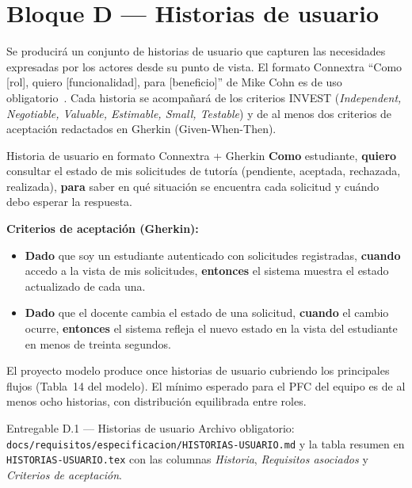 \documentclass[11pt,a4paper]{article}
\begin{document}
\section{Bloque D --- Historias de usuario}

Se producir\'a un conjunto de historias de usuario que capturen las necesidades expresadas por los actores desde su punto de vista. El formato Connextra ``Como [rol], quiero [funcionalidad], para [beneficio]'' de Mike Cohn es de uso obligatorio~\cite{cohn2004userstories}. Cada historia se acompa\~nar\'a de los criterios INVEST (\emph{Independent, Negotiable, Valuable, Estimable, Small, Testable}) y de al menos dos criterios de aceptaci\'on redactados en Gherkin (Given-When-Then).

\begin{cajaconcepto}{Historia de usuario en formato Connextra + Gherkin}
\textbf{Como} estudiante, \textbf{quiero} consultar el estado de mis solicitudes de tutor\'ia (pendiente, aceptada, rechazada, realizada), \textbf{para} saber en qu\'e situaci\'on se encuentra cada solicitud y cu\'ando debo esperar la respuesta.

\textbf{Criterios de aceptaci\'on (Gherkin):}
\begin{itemize}
    \item \textbf{Dado} que soy un estudiante autenticado con solicitudes registradas, \textbf{cuando} accedo a la vista de mis solicitudes, \textbf{entonces} el sistema muestra el estado actualizado de cada una.
    \item \textbf{Dado} que el docente cambia el estado de una solicitud, \textbf{cuando} el cambio ocurre, \textbf{entonces} el sistema refleja el nuevo estado en la vista del estudiante en menos de treinta segundos.
\end{itemize}
\end{cajaconcepto}

El proyecto modelo produce once historias de usuario cubriendo los principales flujos (Tabla~14 del modelo). El m\'inimo esperado para el PFC del equipo es de al menos ocho historias, con distribuci\'on equilibrada entre roles.

\begin{cajaentregable}{Entregable D.1 --- Historias de usuario}
Archivo obligatorio: \texttt{docs/requisitos/especificacion/HISTORIAS-USUARIO.md} y la tabla resumen en \texttt{HISTORIAS-USUARIO.tex} con las columnas \emph{Historia}, \emph{Requisitos asociados} y \emph{Criterios de aceptaci\'on}.
\end{cajaentregable}
\end{document}
